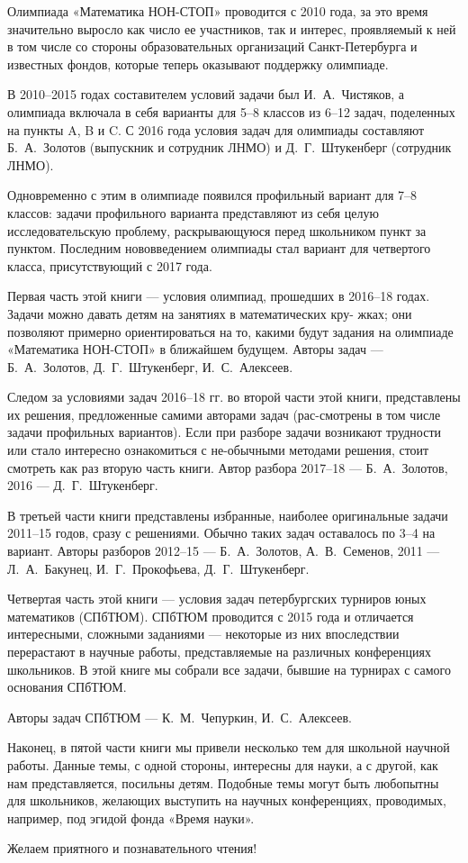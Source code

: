 ﻿\noindent\abz Олимпиада «Математика НОН-СТОП» проводится с 2010 года, за это время значительно выросло как число ее участников, так и интерес, проявляемый к ней в том числе со стороны образовательных организаций Санкт-Петербурга и известных фондов, которые теперь оказывают поддержку олимпиаде.

\aabz В 2010–2015 годах составителем условий задачи был И.~А.~Чистяков, а олимпиада включала в себя варианты для 5–8 классов из 6–12 задач, поделенных на пункты A, B и C. С 2016 года условия задач для олимпиады составляют Б.~А.~Золотов (выпускник и сотрудник ЛНМО) и Д.~Г.~Штукенберг (сотрудник ЛНМО).

\aabz Одновременно с этим в олимпиаде появился профильный вариант для 7–8 классов: задачи профильного варианта представляют из себя целую исследовательскую проблему, раскрывающуюся перед школьником пункт за пунктом. Последним нововведением олимпиады стал вариант для четвертого класса, присутствующий с 2017 года.

\aabz Первая часть этой книги — условия олимпиад, прошедших в 2016–18 годах. Задачи можно давать детям на занятиях в математических кру- жках; они позволяют примерно ориентироваться на то, какими будут задания на олимпиаде «Математика НОН-СТОП» в ближайшем будущем. Авторы задач — Б.~А.~Золотов, Д.~Г.~Штукенберг, И.~С.~Алексеев.

\aabz Следом за условиями задач 2016–18 гг. во второй части этой книги, представлены их решения, предложенные самими авторами задач (рас-\linebreak смотрены в том числе задачи профильных вариантов). Если при разборе задачи возникают трудности или стало интересно ознакомиться с не-\linebreak обычными методами решения, стоит смотреть как раз вторую часть книги. Автор разбора 2017–18 — Б.~А.~Золотов, 2016 — Д.~Г.~Штукенберг.

\aabz В третьей части книги представлены избранные, наиболее оригинальные задачи 2011–15 годов, сразу с решениями. Обычно таких задач оставалось по 3–4 на вариант. Авторы разборов 2012–15 — Б.~А.~Золотов, А.~В.~Семенов, 2011 — Л.~А.~Бакунец, И.~Г.~Прокофьева, Д.~Г.~Штукенберг.

\aabz Четвертая часть этой книги — условия задач петербургских турниров юных математиков (СПбТЮМ). СПбТЮМ проводится с 2015 года и отличается интересными, сложными заданиями — некоторые из них впоследствии перерастают в научные работы, представляемые на различных конференциях школьников. В этой книге мы собрали все задачи, бывшие на турнирах с самого основания СПбТЮМ.

\aabz Авторы задач СПбТЮМ — К.~М.~Чепуркин, И.~С.~Алексеев.

\thispagestyle{empty}

\aabz Наконец, в пятой части книги мы привели несколько тем для школьной научной работы. Данные темы, с одной стороны, интересны для науки, а с другой, как нам представляется, посильны детям. Подобные темы могут быть любопытны для школьников, желающих выступить на научных конференциях, проводимых, например, под эгидой фонда «Время науки».

\aabz Желаем приятного и познавательного чтения!

